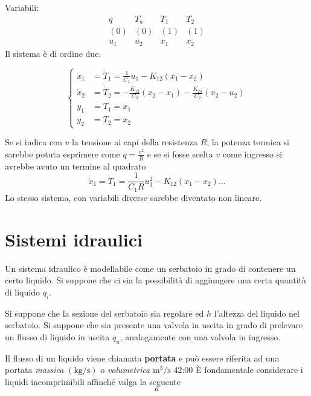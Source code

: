 Variabili:
$$\begin{matrix}
q & T_a & T_1 & T_2 \\
(0) & (0) & (1) & (1) \\
u_1 & u_2 & x_1 & x_2
\end{matrix}$$
Il sistema è di ordine due.

$$\left\{\begin{aligned}
\dot x_1 &= \dot{T}_1 = \frac{1}{C_1}u_1 - K_{12}(x_1-x_2)\\
\dot x_2 &= \dot T_2 = -\frac{K_{12}}{C_2} (x_2-x_1) -
\frac{K_{2a}}{C_2}(x_2-u_2)\\
y_1 &= T_1 = x_1 \\
y_2 &= T_2 = x_2
\end{aligned}\right.$$

Se si indica con $v$ la tensione ai capi della resistenza $R$, la potenza
termica si sarebbe potuta esprimere come $q=\frac{v^2}{R}$ e se si fosse scelta
$v$ come ingresso si avrebbe avuto un termine al quadrato
$$
\dot x_1 = \dot T_1 = \frac{1}{C_1 R} u_1^2 - K_{12}(x_1-x_2) \dots
$$
Lo stesso sistema, con variabili diverse sarebbe diventato non lineare.

\section{Sistemi idraulici}
Un sistema idraulico è modellabile come un serbatoio in grado di contenere un
certo liquido. Si suppone che ci sia la possibilità di aggiungere una certa
quantità di liquido $q_i$.

Si suppone che la sezione del serbatoio sia regolare ed $h$ l'altezza del
liquido nel serbatoio. Si suppone che sia presente una valvola in uscita in
grado di prelevare un flusso di liquido in uscita $q_u$, analogamente con una
valvola in ingresso.

Il flusso di un liquido viene chiamata \textbf{portata} e può essere riferita
ad una portata \textit{massica} $(\si{\kilogram/\second})$
 o \textit{volumetrica} $\si{\meter^3/\second}$
42:00
È fondamentale considerare i liquidi incomprimibili affinché valga la seguente
$$
a
$$

